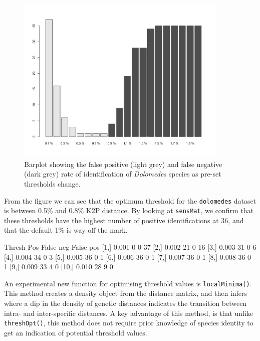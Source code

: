 \documentclass{article}
\newcommand{\fun}[1]{\texttt{#1}}
\begin{document}
\begin{figure}[p]
	\centering
	\includegraphics[width=0.9\textwidth,trim= 3cm 0cm 3cm 0cm]{sensitivity2}
	\caption{Barplot showing the false positive (light grey) and false negative (dark grey) rate of identification of \emph{Dolomedes} species as pre-set thresholds change.}
	\label{sensitivity.fig}
\end{figure}

From the figure we can see that the optimum threshold for the \fun{dolomedes} dataset is between 0.5\% and 0.8\% K2P distance. By looking at \fun{sensMat}, we confirm that these thresholds have the highest number of positive identifications at 36, and that the default 1\% is way off the mark.

\begin{Routput}
      Thresh Pos False neg False pos
 [1,]  0.001   0         0        37
 [2,]  0.002  21         0        16
 [3,]  0.003  31         0         6
 [4,]  0.004  34         0         3
 [5,]  0.005  36         0         1
 [6,]  0.006  36         0         1
 [7,]  0.007  36         0         1
 [8,]  0.008  36         0         1
 [9,]  0.009  33         4         0
[10,]  0.010  28         9         0
\end{Routput}

An experimental new function for optimising threshold values is \fun{localMinima()}. This method creates a density object from the distance matrix, and then infers where a dip in the density of genetic distances indicates the transition between intra- and inter-specific distances. A key advantage of this method, is that unlike \fun{threshOpt()}, this method does not require prior knowledge of species identity to get an indication of potential threshold values.
\end{document}
